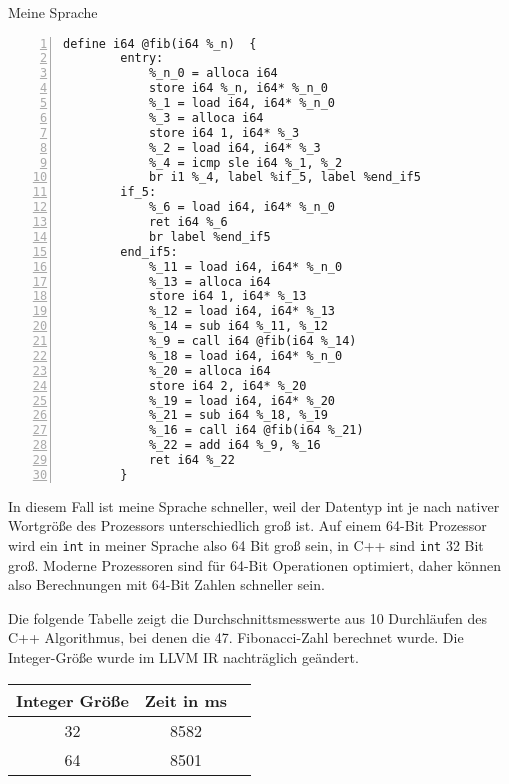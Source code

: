     \begin{center}
        Meine Sprache
    \end{center}

    \begin{lstlisting}[basicstyle=\tiny, numbers=left]
    define i64 @fib(i64 %_n)  {
        entry:
            %_n_0 = alloca i64
            store i64 %_n, i64* %_n_0
            %_1 = load i64, i64* %_n_0
            %_3 = alloca i64
            store i64 1, i64* %_3
            %_2 = load i64, i64* %_3
            %_4 = icmp sle i64 %_1, %_2
            br i1 %_4, label %if_5, label %end_if5 
        if_5:
            %_6 = load i64, i64* %_n_0
            ret i64 %_6
            br label %end_if5
        end_if5:
            %_11 = load i64, i64* %_n_0
            %_13 = alloca i64
            store i64 1, i64* %_13
            %_12 = load i64, i64* %_13
            %_14 = sub i64 %_11, %_12
            %_9 = call i64 @fib(i64 %_14)
            %_18 = load i64, i64* %_n_0
            %_20 = alloca i64
            store i64 2, i64* %_20
            %_19 = load i64, i64* %_20
            %_21 = sub i64 %_18, %_19
            %_16 = call i64 @fib(i64 %_21)
            %_22 = add i64 %_9, %_16
            ret i64 %_22
        }

    \end{lstlisting}

    In diesem Fall ist meine Sprache schneller, weil der Datentyp int je nach 
    nativer Wortgröße des Prozessors unterschiedlich groß ist. Auf einem 64-Bit Prozessor 
    wird ein \texttt{int} in meiner Sprache also 64 Bit groß sein, in C++ sind \texttt{int} 32 Bit groß.
    Moderne Prozessoren sind für 64-Bit Operationen optimiert, daher können also Berechnungen mit 64-Bit Zahlen schneller sein.

    Die folgende Tabelle zeigt die Durchschnittsmesswerte aus 10 Durchläufen des C++ Algorithmus, bei
    denen die 47. Fibonacci-Zahl berechnet wurde.
    Die Integer-Größe wurde im LLVM IR nachträglich geändert.

    \begin{center}

    \begin{tabular}{|c|c|c|}
        \hline
        Integer Größe & Zeit in ms \\
        \hline
        32 & 8582 \\
        64 & 8501 \\
        \hline
    \end{tabular}
    \end{center}

